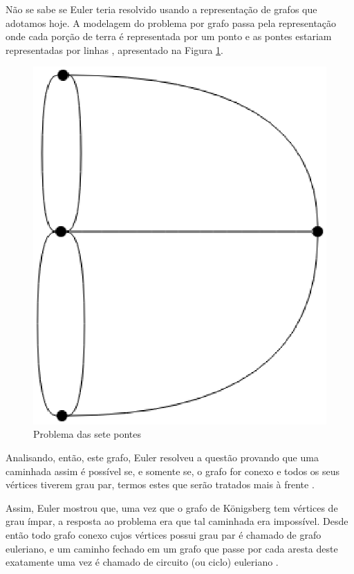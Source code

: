 Não se sabe se Euler teria resolvido usando a representação de grafos que adotamos hoje. A modelagem do problema por grafo passa pela representação onde cada porção de terra  é representada por um ponto e as pontes estariam representadas por linhas \cite{Ore:1963}, apresentado na Figura \ref{sete_pontes}.

\begin{figure}[!h]
	\centering
	\includegraphics[scale=0.5]{figuras/capitulo1/sete_pontes.eps}
	\caption{Problema das sete pontes}
	\label{sete_pontes}
\end{figure}

Analisando, então, este grafo, Euler resolveu a questão provando que uma caminhada assim é possível se, e somente se, o grafo for conexo e todos os seus vértices tiverem grau par, termos estes que serão tratados mais à frente \cite{Malta:2008}.

Assim, Euler mostrou que, uma vez que o grafo de Königsberg tem vértices de grau ímpar, a resposta ao problema era que tal caminhada era impossível. Desde então todo grafo conexo cujos vértices possui grau par é chamado de grafo euleriano, e um caminho fechado em um grafo que passe por cada aresta deste exatamente uma vez é chamado de circuito (ou ciclo) euleriano \cite{Malta:2008}.

